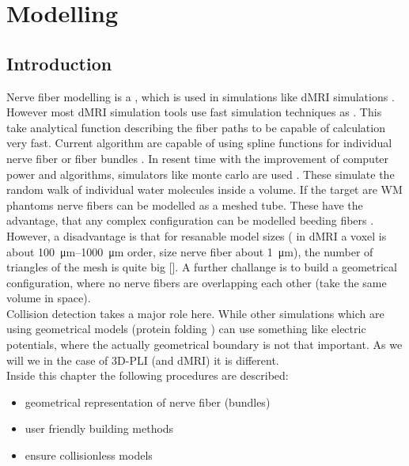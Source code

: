 \setcounter{chapter}{4}
\chapter{Modelling}
\label{chap:modelling}
% 
\section{Introduction}
% 
Nerve fiber modelling is a \dummy, which is  used in simulations like \ac{dMRI} simulations \dummy.
However most \ac{dMRI} simulation tools use fast simulation techniques as \dummy.
This take analytical function describing the fiber paths to be capable of calculation very fast.
% 
Current algorithm are capable of using spline functions for individual nerve fiber or fiber bundles \cite{Balls2009}.
% 
In resent time with the improvement of computer power and algorithms, simulators like monte carlo are used \dummy.
These simulate the random walk of individual water molecules inside a volume.
If the target are \ac{WM} phantoms nerve fibers can be modelled as a meshed tube.
These have the advantage, that any complex configuration can be modelled \eg beeding fibers \dummy.
\\
%
However, a disadvantage is that for resanable model sizes ( in \ac{dMRI} a voxel is about \SIrange{100}{1000}{\micro\meter} order, size nerve fiber about \SI{1}{\micro\meter}), the number of triangles of the mesh is quite big [\dummy].
A further challange is to build a geometrical configuration, where no nerve fibers are overlapping each other (\ie  take the same volume in space).
\\
% 
Collision detection takes a major role here.
While other simulations which are using geometrical models (\eg protein folding \dummy) can use something like electric potentials, where the actually geometrical boundary is not that important.
As we will we in the case of \ac{3D-PLI} (and \ac{dMRI}) it is different.
\\
% 
Inside this chapter the following procedures are described:
\begin{itemize}[nosep]
    \item geometrical representation of nerve fiber (bundles)
    \item user friendly building methods
    \item ensure collisionless models
\end{itemize}
% 

